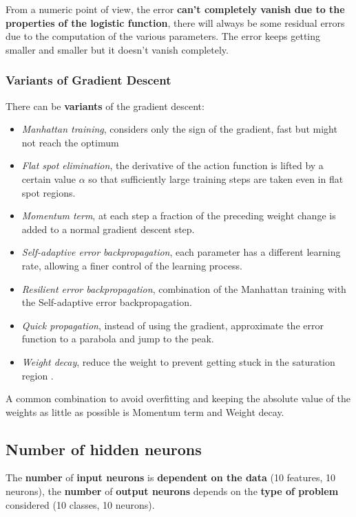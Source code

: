 \documentclass[11pt]{article}
\begin{document}
		From a numeric point of view, the error \textbf{can't completely vanish due to the properties of the logistic function}, there will always be some residual errors due to the computation of the various parameters. The error keeps getting smaller and smaller but it doesn't vanish completely.\\
		
		\newpage
		
		\subsubsection{Variants of Gradient Descent}
		There can be \textbf{variants} of the gradient descent: 
		\begin{itemize}
			\item \textit{Manhattan training}, considers only the sign of the gradient, fast but might not reach the optimum
			\item \textit{Flat spot elimination}, the derivative of the action function is lifted by a certain value $\alpha$ so that sufficiently large training steps are taken even in flat spot regions.\\
			\item \textit{Momentum term}, at each step a fraction of the preceding weight change is added to a normal gradient descent step.\\
			\item \textit{Self-adaptive error backpropagation}, each parameter has a different learning rate, allowing a finer control of the learning process.\\
			\item \textit{Resilient error backpropagation}, combination of the Manhattan training with the Self-adaptive error backpropagation.\\
			\item \textit{Quick propagation}, instead of using the gradient, approximate the error function to a parabola and jump to the peak.\\
			\item \textit{Weight decay}, reduce the weight to prevent getting stuck in the saturation region .\\
		\end{itemize}
		A common combination to avoid overfitting and keeping the absolute value of the weights as little as possible is Momentum term and Weight decay.\\
		
		\newpage
		
		\subsection{Number of hidden neurons}
		The \textbf{number} of \textbf{input neurons} is \textbf{dependent on the data} (10 features, 10 neurons), the \textbf{number} of \textbf{output neurons} depends on the \textbf{type of problem} considered (10 classes, 10 neurons).\\
		
\end{document}
